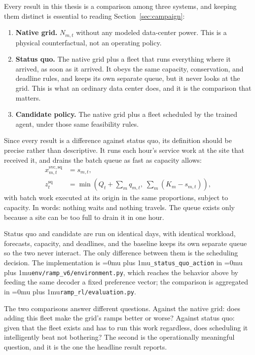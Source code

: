 ﻿\documentclass[12pt]{article}
\newcommand{\codepath}[1]{{\Urlmuskip=0mu plus 1mu\relax\nolinkurl{#1}}}
\begin{document}
Every result in this thesis is a comparison among three systems, and keeping
them distinct is essential to reading Section~\ref{sec:campaign}:
\begin{enumerate}
  \item \textbf{Native grid.} \(N_{m,t}\) without any modeled data-center power.
        This is a physical counterfactual, not an operating policy.
  \item \textbf{Status quo.} The native grid plus a fleet that runs everything
        where it arrived, as soon as it arrived. It obeys the same capacity,
        conservation, and deadline rules, and keeps its own separate queue, but
        it never looks at the grid. This is what an ordinary data center does,
        and it is the comparison that matters.
  \item \textbf{Candidate policy.} The native grid plus a fleet scheduled by the
        trained agent, under those same feasibility rules.
\end{enumerate}

Since every result is a difference against status quo, its definition should be
precise rather than descriptive. It runs each hour's service work at the site
that received it, and drains the batch queue as fast as capacity allows:
\begin{align}
  x^{\mathrm{svc},\mathrm{sq}}_{m,t} &= s_{m,t}, \\
  z^{\mathrm{sq}}_t &= \min\!\left(Q_t + \textstyle\sum_m q_{m,t},\;
                       \textstyle\sum_m \left(K_m - s_{m,t}\right)\right),
  \label{eq:status-quo}
\end{align}
with batch work executed at its origin in the same proportions, subject to
capacity. In words: nothing waits and nothing travels. The queue exists only
because a site can be too full to drain it in one hour.

Status quo and candidate are run on identical days, with identical workload,
forecasts, capacity, and deadlines, and the baseline keeps its own separate
queue so the two never interact. The only difference between them is the
scheduling decision. The implementation is \codepath{_status_quo_action} in
\codepath{env/ramp_v6/environment.py}, which reaches the behavior above by
feeding the same decoder a fixed preference vector; the comparison is
aggregated in \codepath{ramp_rl/evaluation.py}.

The two comparisons answer different questions. Against the native grid: does
adding this fleet make the grid's ramps better or worse? Against status quo:
given that the fleet exists and has to run this work regardless, does scheduling
it intelligently beat not bothering? The second is the operationally meaningful
question, and it is the one the headline result reports.
\end{document}
